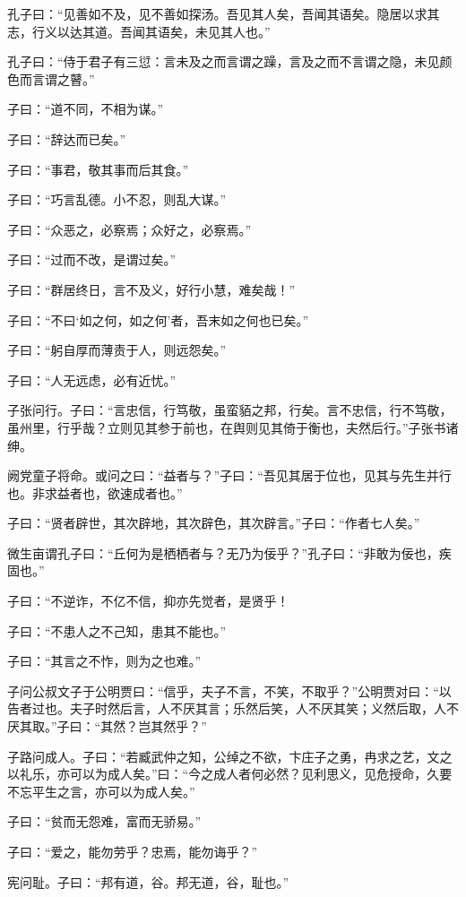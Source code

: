 \documentclass[a5paper]{ctexbook}
\begin{document}
    孔子曰：“见善如不及，见不善如探汤。吾见其人矣，吾闻其语矣。隐居以求其志，行义以达其道。吾闻其语矣，未见其人也。”

    孔子曰：“侍于君子有三愆：言未及之而言谓之躁，言及之而不言谓之隐，未见颜色而言谓之瞽。”

    子曰：“道不同，不相为谋。” 
    
    子曰：“辞达而已矣。”

    子曰：“事君，敬其事而后其食。”

    子曰：“巧言乱德。小不忍，则乱大谋。” 
    
    子曰：“众恶之，必察焉；众好之，必察焉。” 
    
    子曰：“过而不改，是谓过矣。”

    子曰：“群居终日，言不及义，好行小慧，难矣哉！”

    子曰：“不曰‘如之何，如之何’者，吾末如之何也已矣。”

    子曰：“躬自厚而薄责于人，则远怨矣。”

    子曰：“人无远虑，必有近忧。”

    子张问行。子曰：“言忠信，行笃敬，虽蛮貊之邦，行矣。言不忠信，行不笃敬，虽州里，行乎哉？立则见其参于前也，在舆则见其倚于衡也，夫然后行。”子张书诸绅。

    阙党童子将命。或问之曰：“益者与？”子曰：“吾见其居于位也，见其与先生并行也。非求益者也，欲速成者也。”

    子曰：“贤者辟世，其次辟地，其次辟色，其次辟言。”子曰：“作者七人矣。”

    微生亩谓孔子曰：“丘何为是栖栖者与？无乃为佞乎？”孔子曰：“非敢为佞也，疾固也。”

    子曰：“不逆诈，不亿不信，抑亦先觉者，是贤乎！

    子曰：“不患人之不己知，患其不能也。”

    子曰：“其言之不怍，则为之也难。”

    子问公叔文子于公明贾曰：“信乎，夫子不言，不笑，不取乎？”公明贾对曰：“以告者过也。夫子时然后言，人不厌其言；乐然后笑，人不厌其笑；义然后取，人不厌其取。”子曰：“其然？岂其然乎？”

    子路问成人。子曰：“若臧武仲之知，公绰之不欲，卞庄子之勇，冉求之艺，文之以礼乐，亦可以为成人矣。”曰：“今之成人者何必然？见利思义，见危授命，久要不忘平生之言，亦可以为成人矣。”

    子曰：“贫而无怨难，富而无骄易。”

    子曰：“爱之，能勿劳乎？忠焉，能勿诲乎？”

    宪问耻。子曰：“邦有道，谷。邦无道，谷，耻也。”    
\end{document}
